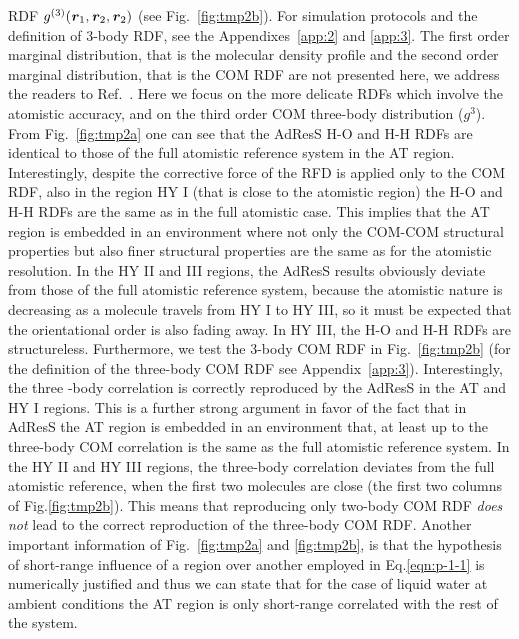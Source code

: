\documentclass[aip,jcp,a4paper,reprint,onecolumn]{revtex4-1}
\newcommand{\vect}[1]{\textbf{\textit{#1}}}
\begin{document}
RDF $g^{(3)}(\vect r_1, \vect r_2, \vect r_2)$ (see Fig.~\ref{fig:tmp2b}). For simulation
protocols and the definition of 3-body RDF, see the Appendixes~\ref{app:2} and \ref{app:3}.
The first order marginal distribution, that is the molecular density profile and the second order marginal distribution, that is the COM RDF are not presented here, we address the readers to Ref.~\cite{rdfcorr}. 
Here we focus on the more delicate RDFs which involve the atomistic accuracy, and on the third order COM three-body distribution ($g^{3}$). From Fig.~\ref{fig:tmp2a} one can see that
the AdResS H-O and H-H RDFs are identical to those of 
the full atomistic reference system in the AT region.
Interestingly, despite the corrective force of the RFD is applied only to the COM RDF, also in the region HY I (that is close to the atomistic region) the H-O and H-H RDFs are the same as in the full atomistic case.
This implies that the AT region
is embedded in an environment where not only the COM-COM structural properties but also finer structural
properties are the same as for the atomistic resolution.
In the HY II and III regions, the AdResS results obviously deviate from those
of the full atomistic reference system, because the atomistic nature 
is decreasing as a molecule travels from HY I to HY III, so it must be expected 
that the orientational order is also fading away. In HY III, the H-O and H-H
RDFs are structureless.
Furthermore, we test the 3-body COM RDF in Fig.~\ref{fig:tmp2b} (for the definition of the three-body COM RDF see Appendix~\ref{app:3}).
Interestingly, the three -body correlation is correctly reproduced
by the AdResS in the AT and HY I  regions. This is a further strong argument in favor of the fact that in AdResS the AT region is embedded in an environment that, at least up to the three-body COM correlation is the same as the full atomistic reference system.
In the HY II and HY III regions, the three-body correlation deviates from the
full atomistic reference, when the first two molecules are close (the first
two columns of Fig.\ref{fig:tmp2b}). This means that reproducing only two-body COM RDF \emph{does not}
lead to the correct reproduction of the three-body COM RDF.
Another important information of Fig.~\ref{fig:tmp2a} and \ref{fig:tmp2b},
is that the hypothesis of short-range influence of a region over another employed in Eq.\ref{eqn:p-1-1} is numerically justified and thus we can state that for the case of liquid water at ambient conditions the AT region is only short-range
correlated with the rest of the system.
\end{document}
